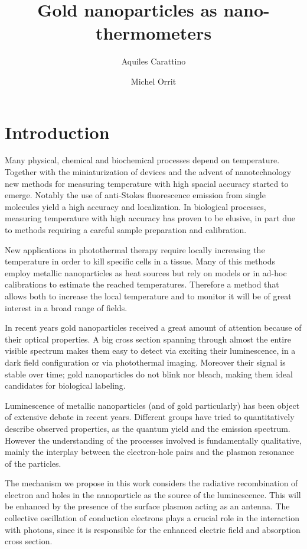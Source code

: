 \documentclass[journal=nalefd,manuscript=letter]{achemso}
\author{Aquiles Carattino}
\affiliation[Leiden]
{Huygens-Kamerlingh Onnes, Leiden, The Netherlands}
\author{Michel Orrit}
\affiliation[Leiden]
{Huygens-Kamerlingh Onnes Lab, 2300RA Leiden, The Netherlands}
\title{Gold nanoparticles as nano-thermometers}
\begin{document}
\maketitle
{}
\section{Introduction}
Many physical, chemical and biochemical processes depend on temperature.
Together with the miniaturization of devices and the advent of nanotechnology
new methods for measuring temperature with high spacial accuracy started to
emerge. Notably the use of anti-Stokes fluorescence emission from single
molecules yield a high accuracy and localization. In biological processes,
measuring temperature with high accuracy has proven to be elusive, in part due
to methods requiring a careful sample preparation and calibration. 

New applications in photothermal therapy require locally increasing the
temperature in order to kill specific cells in a tissue. Many of this methods
employ metallic nanoparticles as heat sources but rely on models or in ad-hoc
calibrations to estimate the reached temperatures. Therefore a method that
allows both to increase the local temperature and to monitor it will be of great
interest in a broad range of fields. 

In recent years gold nanoparticles received a great amount of attention because
of their optical properties. A big cross section spanning through almost the entire
visible spectrum makes them easy to detect via exciting their luminescence, in
a dark field configuration or via photothermal imaging. Moreover their signal is
stable over time; gold nanoparticles do not blink nor bleach, making them ideal
candidates for biological labeling. 

Luminescence of metallic nanoparticles (and of gold particularly) has been
object of extensive debate in recent years. Different groups have tried to
quantitatively describe observed properties, as the quantum yield and the
emission spectrum. However the understanding of the processes involved is
fundamentally qualitative, mainly the interplay between the electron-hole pairs
and the plasmon resonance of the particles. 

The mechanism we propose in this work considers the radiative recombination of
electron and holes in the nanoparticle as the source of the luminescence. This
will be enhanced by the presence of the surface plasmon acting as an antenna.
The collective oscillation of conduction electrons plays a crucial role in the
interaction with photons, since it is responsible for the enhanced electric
field and absorption cross section. 
\end{document}
